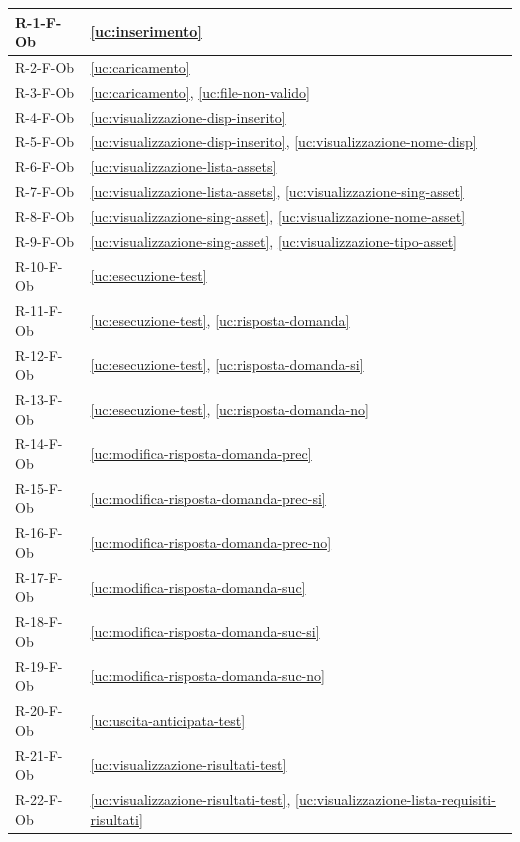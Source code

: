 ﻿\documentclass[a4paper,12pt]{article}
\begin{document}
{\begin{longtable}{|
      >{\centering\arraybackslash}p{}|
      >{\centering\arraybackslash}p{}|
      }
      \hline
      \endlastfoot
      \hline
        R-1-F-Ob & \ref{uc:inserimento} \\ \hline
        R-2-F-Ob & \ref{uc:caricamento} \\ \hline
        R-3-F-Ob & \ref{uc:caricamento}, \ref{uc:file-non-valido} \\ \hline
        R-4-F-Ob & \ref{uc:visualizzazione-disp-inserito} \\ \hline
        R-5-F-Ob & \ref{uc:visualizzazione-disp-inserito}, \ref{uc:visualizzazione-nome-disp} \\ \hline
        R-6-F-Ob & \ref{uc:visualizzazione-lista-assets} \\ \hline
        R-7-F-Ob & \ref{uc:visualizzazione-lista-assets}, \ref{uc:visualizzazione-sing-asset} \\ \hline
        R-8-F-Ob & \ref{uc:visualizzazione-sing-asset}, \ref{uc:visualizzazione-nome-asset} \\ \hline
        R-9-F-Ob & \ref{uc:visualizzazione-sing-asset}, \ref{uc:visualizzazione-tipo-asset} \\ \hline
        R-10-F-Ob & \ref{uc:esecuzione-test} \\ \hline
        R-11-F-Ob & \ref{uc:esecuzione-test}, \ref{uc:risposta-domanda} \\ \hline
        R-12-F-Ob & \ref{uc:esecuzione-test}, \ref{uc:risposta-domanda-si} \\ \hline
        R-13-F-Ob & \ref{uc:esecuzione-test}, \ref{uc:risposta-domanda-no} \\ \hline
        R-14-F-Ob & \ref{uc:modifica-risposta-domanda-prec} \\ \hline
        R-15-F-Ob & \ref{uc:modifica-risposta-domanda-prec-si} \\ \hline
        R-16-F-Ob & \ref{uc:modifica-risposta-domanda-prec-no} \\ \hline
        R-17-F-Ob & \ref{uc:modifica-risposta-domanda-suc} \\ \hline
        R-18-F-Ob & \ref{uc:modifica-risposta-domanda-suc-si} \\ \hline
        R-19-F-Ob & \ref{uc:modifica-risposta-domanda-suc-no} \\ \hline
        R-20-F-Ob & \ref{uc:uscita-anticipata-test} \\ \hline
        R-21-F-Ob & \ref{uc:visualizzazione-risultati-test} \\ \hline
        R-22-F-Ob & \ref{uc:visualizzazione-risultati-test}, \ref{uc:visualizzazione-lista-requisiti-risultati} \\ \hline

\end{longtable}}
\end{document}
